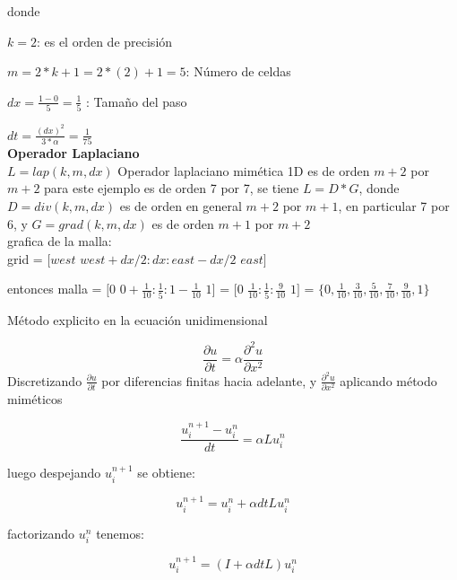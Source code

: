 \documentclass[a4paper,abstract=true]{scrreprt}
\begin{document}
donde

$k = 2$: es el orden de precisión

$m = 2*k+1=2*(2)+1 = 5$: Número de celdas

$dx =\frac{1-0}{5} =\frac{1}{5}$ : Tamaño del paso

$dt = \frac{(dx)^{2}}{3*\alpha} =\frac{1}{75}$\\

\textbf{\textbf{Operador Laplaciano}}\\

$L = lap(k,m,dx)$  Operador laplaciano mimética 1D es de orden $m+2$ por $m+2$ para este ejemplo es de orden  7 por 7,  se tiene $L = D* G$, donde $D = div(k,m,dx)$ es de orden en general $m+2$ por $m+1$, en particular 7 por 6, y $G = grad(k,m,dx)$ es de orden $m+1$ por $m+2$\\


grafica de la malla:\\


grid = $[west$  $west+dx/2: dx :east-dx/2$  $east]$

entonces malla = $[0$ $0+\frac{1}{10}: \frac{1}{5}: 1-\frac{1}{10}$ $1  ]$ = $[0$ $\frac{1}{10}: \frac{1}{5}: \frac{9}{10}$ $1]$ = $  \{0, \frac{1}{10}, \frac{3}{10}, \frac{5}{10}, \frac{7}{10}, \frac{9}{10}, 1 \}$


Método explicito en la ecuación unidimensional

\begin{equation}
    \frac{\partial u}{\partial t} = \alpha \frac{\partial^{2} u}{\partial x^{2}}
\end{equation}
Discretizando  $\frac{\partial u}{\partial t}$ por diferencias finitas hacia adelante, y $\frac{\partial^{2} u}{\partial x^{2}}$ aplicando método miméticos

\begin{equation}
    \frac{u^{n+1}_{i} - u^{n}_{i} }{dt} = \alpha L 	u^{n}_{i}
\end{equation}

luego despejando $u^{n+1}_{i}$ se obtiene:

\begin{equation}
    u^{n+1}_{i} = u^{n}_{i}  +  \alpha dt L u^{n}_{i}
\end{equation}

factorizando $u^{n}_{i}$ tenemos:

\begin{equation}
    u^{n+1}_{i} = (I  +  \alpha dt L )u^{n}_{i}
\end{equation}
\end{document}

